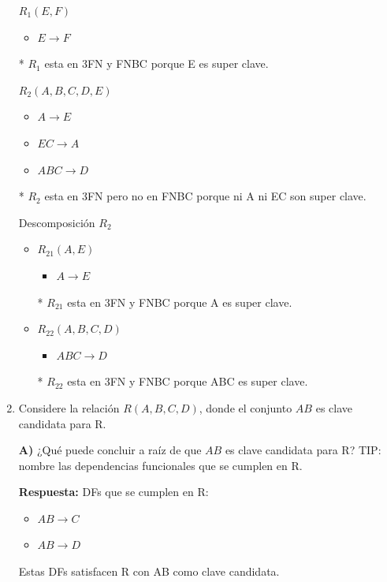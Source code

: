 \documentclass{templateNote}
\begin{document}
\begin{enumerate}
    $R_1 (E,F)$ 
    \begin{itemize}
        \item $E \rightarrow F$
    \end{itemize}
    * $R_1$ esta en 3FN y FNBC porque E es super clave.

    $R_2 (A,B,C,D,E)$
    \begin{itemize}
        \item $A \rightarrow E$ 
        \item $EC \rightarrow A$
        \item $ABC \rightarrow D$
    \end{itemize}

    * $R_2$ esta en 3FN pero no en FNBC porque ni A ni EC son super clave.

    Descomposición $R_2$
    \begin{itemize}
        \item $R_{21}(A,E)$
        \begin{itemize}
            \item $A \rightarrow E$
        \end{itemize}

        * $R_{21}$ esta en 3FN y FNBC porque A es super clave.
        \item $R_{22}(A,B,C,D)$
        \begin{itemize}
            \item $ABC \rightarrow D$
        \end{itemize}

        * $R_{22}$ esta en 3FN y FNBC porque ABC es super clave.
    \end{itemize}

    \hrulefill

    \item Considere la relación $R(A,B,C,D)$, donde el conjunto $AB$ es clave candidata para R.
    
    \textbf{A)} ¿Qué puede concluir a raíz de que $AB$ es clave candidata para R? TIP: nombre las dependencias funcionales que se cumplen en R.
    
    \textbf{Respuesta:}
    DFs que se cumplen en R:
    \begin{itemize}
        \item $AB \rightarrow C$
        \item $AB \rightarrow D$
    \end{itemize}

    Estas DFs satisfacen R con AB como clave candidata.


\end{enumerate}
\end{document}
